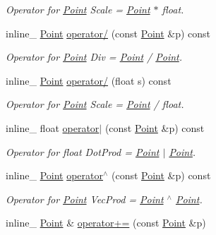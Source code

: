 \begin{DoxyCompactItemize}
\begin{DoxyCompactList}\small\item\em Operator for \hyperlink{class_point}{Point} Scale = \hyperlink{class_point}{Point} $\ast$ float. \end{DoxyCompactList}\item 
\hypertarget{class_point_a037936b3197c2210ec25a2a2819408a5}{inline\+\_\+ \hyperlink{class_point}{Point} \hyperlink{class_point_a037936b3197c2210ec25a2a2819408a5}{operator/} (const \hyperlink{class_point}{Point} \&p) const }\label{class_point_a037936b3197c2210ec25a2a2819408a5}

\begin{DoxyCompactList}\small\item\em Operator for \hyperlink{class_point}{Point} Div = \hyperlink{class_point}{Point} / \hyperlink{class_point}{Point}. \end{DoxyCompactList}\item 
\hypertarget{class_point_aca070237fde514ce1b1a4c315b18980b}{inline\+\_\+ \hyperlink{class_point}{Point} \hyperlink{class_point_aca070237fde514ce1b1a4c315b18980b}{operator/} (float s) const }\label{class_point_aca070237fde514ce1b1a4c315b18980b}

\begin{DoxyCompactList}\small\item\em Operator for \hyperlink{class_point}{Point} Scale = \hyperlink{class_point}{Point} / float. \end{DoxyCompactList}\item 
\hypertarget{class_point_a6293b6c133a4d1dcbd0c78ae5efe989b}{inline\+\_\+ float \hyperlink{class_point_a6293b6c133a4d1dcbd0c78ae5efe989b}{operator$\vert$} (const \hyperlink{class_point}{Point} \&p) const }\label{class_point_a6293b6c133a4d1dcbd0c78ae5efe989b}

\begin{DoxyCompactList}\small\item\em Operator for float Dot\+Prod = \hyperlink{class_point}{Point} $\vert$ \hyperlink{class_point}{Point}. \end{DoxyCompactList}\item 
\hypertarget{class_point_a54def8e38ec141a5f163a460dd270af2}{inline\+\_\+ \hyperlink{class_point}{Point} \hyperlink{class_point_a54def8e38ec141a5f163a460dd270af2}{operator$^\wedge$} (const \hyperlink{class_point}{Point} \&p) const }\label{class_point_a54def8e38ec141a5f163a460dd270af2}

\begin{DoxyCompactList}\small\item\em Operator for \hyperlink{class_point}{Point} Vec\+Prod = \hyperlink{class_point}{Point} $^\wedge$ \hyperlink{class_point}{Point}. \end{DoxyCompactList}\item 
\hypertarget{class_point_ad85cea8275d83302dc3bf029fd89aa9e}{inline\+\_\+ \hyperlink{class_point}{Point} \& \hyperlink{class_point_ad85cea8275d83302dc3bf029fd89aa9e}{operator+=} (const \hyperlink{class_point}{Point} \&p)}\label{class_point_ad85cea8275d83302dc3bf029fd89aa9e}


\end{DoxyCompactItemize}
